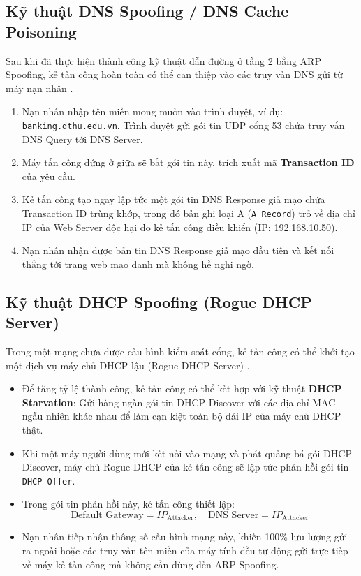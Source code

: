 \subsection{Kỹ thuật DNS Spoofing / DNS Cache Poisoning}

Sau khi đã thực hiện thành công kỹ thuật dẫn đường ở tầng 2 bằng ARP Spoofing, kẻ tấn công hoàn toàn có thể can thiệp vào các truy vấn DNS gửi từ máy nạn nhân \cite{rfc1035_dns}.
\begin{enumerate}
  \item Nạn nhân nhập tên miền mong muốn vào trình duyệt, ví dụ: \texttt{banking.dthu.edu.vn}. Trình duyệt gửi gói tin UDP cổng 53 chứa truy vấn DNS Query tới DNS Server.
  \item Máy tấn công đứng ở giữa sẽ bắt gói tin này, trích xuất mã \textbf{Transaction ID} của yêu cầu.
  \item Kẻ tấn công tạo ngay lập tức một gói tin DNS Response giả mạo chứa Transaction ID trùng khớp, trong đó bản ghi loại A (\texttt{A Record}) trỏ về địa chỉ IP của Web Server độc hại do kẻ tấn công điều khiển (IP: 192.168.10.50).
  \item Nạn nhân nhận được bản tin DNS Response giả mạo đầu tiên và kết nối thẳng tới trang web mạo danh mà không hề nghi ngờ.
\end{enumerate}

\subsection{Kỹ thuật DHCP Spoofing (Rogue DHCP Server)}

Trong một mạng chưa được cấu hình kiểm soát cổng, kẻ tấn công có thể khởi tạo một dịch vụ máy chủ DHCP lậu (Rogue DHCP Server) \cite{rfc2131_dhcp}.
\begin{itemize}
  \item Để tăng tỷ lệ thành công, kẻ tấn công có thể kết hợp với kỹ thuật \textbf{DHCP Starvation}: Gửi hàng ngàn gói tin DHCP Discover với các địa chỉ MAC ngẫu nhiên khác nhau để làm cạn kiệt toàn bộ dải IP của máy chủ DHCP thật.
  \item Khi một máy người dùng mới kết nối vào mạng và phát quảng bá gói DHCP Discover, máy chủ Rogue DHCP của kẻ tấn công sẽ lập tức phản hồi gói tin \texttt{DHCP Offer}.
  \item Trong gói tin phản hồi này, kẻ tấn công thiết lập:
    \begin{equation}
      \text{Default Gateway} = IP_{\text{Attacker}}, \quad \text{DNS Server} = IP_{\text{Attacker}}
    \end{equation}
  \item Nạn nhân tiếp nhận thông số cấu hình mạng này, khiến 100\% lưu lượng gửi ra ngoài hoặc các truy vấn tên miền của máy tính đều tự động gửi trực tiếp về máy kẻ tấn công mà không cần dùng đến ARP Spoofing.
\end{itemize}

